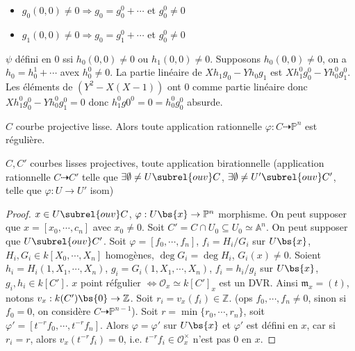 \begin{expl}
\begin{enumerate}
                \begin{itemize}
                    \item $g_0(0,0) \neq 0 \Rightarrow g_0 = g_0^0 + \cdots$ et $g_0^0 \neq 0$
                    \item $g_1(0,0) \neq 0 \Rightarrow g_0 = g_1^0 + \cdots$ et $g_0^0 \neq 0$
                \end{itemize}
                $\psi$ défini en $0$ ssi $h_0(0,0) \neq 0$ ou $h_1(0,0) \neq 0$. Supposons $h_0(0,0) \neq 0$, on a $h_0 = h_0^1 + \cdots$ avex $h_0^0 \neq 0$. La partie linéaire de $Xh_1g_0 - Yh_0g_1$ est $Xh_1^0g_0^0 -  Yh_0^0g_1^0$. Les éléments de $(Y^2 - X(X - 1))$ ont $0$ comme partie linéaire donc $Xh_1^0g_0^0 -  Yh_0^0g_1^0 = 0$ donc $h_1^0g0^0 = 0 = h_0^0 g_0^0$ absurde.
            \end{enumerate}
        \end{expl}
        \begin{coro}
            $C$ courbe projective lisse. Alors toute application rationnelle $\varphi : C \dashrightarrow \mathbb{P}^n$ est régulière.
        \end{coro}
        \begin{coro}
            $C,C'$ courbes lisses projectives, toute application birationnelle (application rationnelle $C \dashrightarrow C'$ telle que $\exists \emptyset \neq U \subrel{ouv} C$, $\exists \emptyset \neq U' \subrel{ouv} C'$, telle que $\varphi : U \to U'$ isom)
        \end{coro}
        \begin{proof}
            $x \in U \subrel{ouv} C$, $\varphi : U \bs \{x\} \to \mathbb{P}^n$ morphisme. On peut supposer que $x = [x_0, \cdots, c_n]$ avec $x_0 \neq 0$. Soit $C' = C \cap U_0 \subseteq U_0 \simeq \mathbb{A}^n$. On peut supposer que $U \subrel{ouv} C'$. Soit $\varphi = [f_0, \cdots, f_n]$, $f_i = H_i/G_i$ sur $U \bs \{x\}$, $H_i, G_i \in k[X_0, \cdots, X_n]$ homogènes, $\deg G_i = \deg H_i$, $G_i(x) \neq 0$. Soient $h_i = H_i(1,X_1, \cdots, X_n)$, $g_i = G_i(1,X_1, \cdots, X_n)$, $f_i = h_i/g_i$ sur $U \bs \{x\}$, $g_i,h_i \in k[C']$. $x$ point réfgulier $\iff \mathcal{O}_x \simeq k[C']_x$ est un DVR. Ainsi $\mathfrak{m}_x = (t)$, notons $v_x : k(C')  \bs \{0\} \to \mathbb{Z}$. Soit $r_i = v_x(f_i) \in \mathbb{Z}$. (ops $f_0, \cdots, f_n \neq 0$, sinon si $f_0 = 0$, on considère $C \dashrightarrow \mathbb{P}^{n-1}$). Soit $r = \min \{r_0, \cdots, r_n\}$, soit $\varphi' = [t^{-r}f_0, \cdots, t^{-r}f_n]$. Alors $\varphi = \varphi'$ sur $U \bs \{x\}$ et $\varphi'$ est défini en $x$, car si $r_i = r$, alors $v_x(t^{-r}f_i) = 0$, i.e. $t^{-r}f_i \in \mathcal{O}_x^\times$ n'est pas $0$ en $x$.
        \end{proof}
